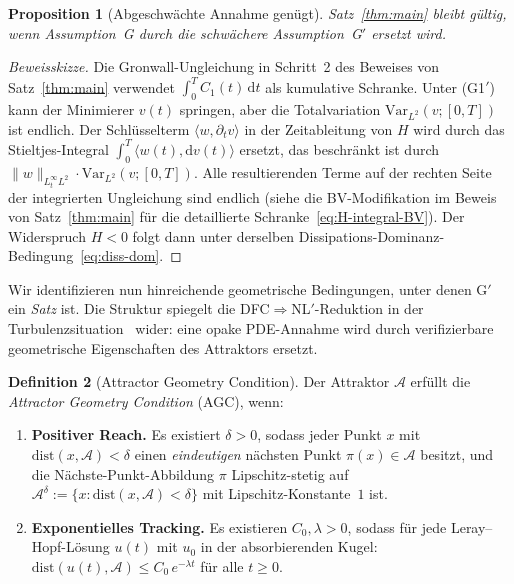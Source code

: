 \documentclass[12pt,a4paper]{article}
\theoremstyle{definition}
\newtheorem{definition}{Definition}[section]
\theoremstyle{plain}
\newtheorem{proposition}[definition]{Proposition}
\theoremstyle{remark}
\begin{document}
\begin{proposition}[Abgeschwächte Annahme genügt]\label{prop:Gprime}
Satz~\ref{thm:main} bleibt gültig, wenn Assumption~G durch die
schwächere Assumption~G$'$ ersetzt wird.
\end{proposition}

\begin{proof}[Beweisskizze]
Die Gronwall-Ungleichung in Schritt~2 des Beweises von
Satz~\ref{thm:main} verwendet $\int_0^T C_1(t)\,\mathrm{d} t$ als kumulative
Schranke. Unter (G1$'$) kann der Minimierer $v(t)$ springen, aber die Totalvariation $\mathrm{Var}_{L^2}(v;[0,T])$ ist endlich. Der Schlüsselterm
$\langle w, \partial_t v \rangle$ in der Zeitableitung von $H$ wird
durch das Stieltjes-Integral $\int_0^T \langle w(t),
\mathrm{d} v(t)\rangle$ ersetzt, das beschränkt ist durch $\|w\|_{L^\infty_t L^2}\cdot
\mathrm{Var}_{L^2}(v;[0,T])$. Alle resultierenden Terme auf der rechten Seite
der integrierten Ungleichung sind endlich (siehe die BV-Modifikation
im Beweis von Satz~\ref{thm:main} für die detaillierte
Schranke~\eqref{eq:H-integral-BV}). Der Widerspruch $H < 0$ folgt
dann unter derselben Dissipations-Dominanz-Bedingung~\eqref{eq:diss-dom}.
\end{proof}

Wir identifizieren nun hinreichende geometrische Bedingungen, unter denen G$'$ ein
\emph{Satz} ist. Die Struktur spiegelt die DFC$\Rightarrow$NL$'$-Reduktion
in der Turbulenzsituation~\cite{FST-TU2026} wider: eine opake PDE-Annahme wird
durch verifizierbare geometrische Eigenschaften des Attraktors ersetzt.

\begin{definition}[Attractor Geometry Condition]\label{def:AGC}
Der Attraktor $\mathcal{A}$ erfüllt die \emph{Attractor Geometry
Condition} (AGC), wenn:
\begin{enumerate}
  \item[\textup{(AGC1)}] \textbf{Positiver Reach.}\;
    Es existiert $\delta > 0$, sodass jeder Punkt $x$ mit
    $\mathrm{dist}(x, \mathcal{A}) < \delta$ einen \emph{eindeutigen}
    nächsten Punkt $\pi(x) \in \mathcal{A}$ besitzt, und die Nächste-Punkt-Abbildung
    $\pi$ Lipschitz-stetig auf
    $\mathcal{A}^\delta := \{x : \mathrm{dist}(x,\mathcal{A}) < \delta\}$
    mit Lipschitz-Konstante~$1$ ist.
  \item[\textup{(AGC2)}] \textbf{Exponentielles Tracking.}\;
    Es existieren $C_0, \lambda > 0$, sodass für jede Leray--Hopf-Lösung
    $u(t)$ mit $u_0$ in der absorbierenden Kugel:
    $\mathrm{dist}(u(t), \mathcal{A}) \le C_0\,e^{-\lambda t}$ für alle
    $t \ge 0$.
\end{enumerate}
\end{definition}
\end{document}
